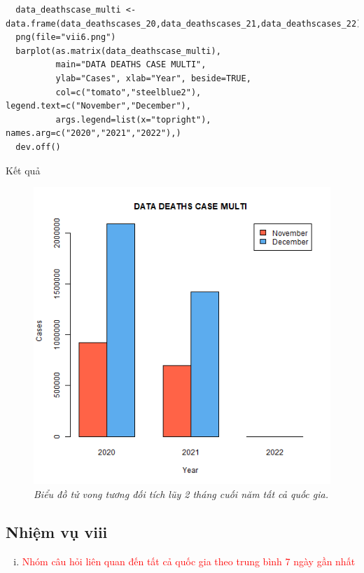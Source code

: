 \documentclass[a4paper]{article}
\theoremstyle{definition}
\begin{document}
\begin{enumerate}[1)]
\begin{lstlisting}
  data_deathscase_multi <- data.frame(data_deathscases_20,data_deathscases_21,data_deathscases_22)
  png(file="vii6.png")
  barplot(as.matrix(data_deathscase_multi),
          main="DATA DEATHS CASE MULTI",
          ylab="Cases", xlab="Year", beside=TRUE, 
          col=c("tomato","steelblue2"), legend.text=c("November","December"), 
          args.legend=list(x="topright"), names.arg=c("2020","2021","2022"),)
  dev.off()
\end{lstlisting}
Kết quả
\begin{figure}[H]
        \begin{center}
            \includegraphics[scale=0.4]{vii/vii6.png} 
        \end{center}
        \vspace{+3mm}\caption{\it Biểu đồ tử vong tương đối tích lũy 2 tháng cuối năm tất cả quốc gia.}
    \end{figure}
\end{enumerate}











\subsection{Nhiệm vụ viii}
\begin{enumerate}[viii)]
\item \textcolor{red}{Nhóm câu hỏi liên quan đến tất cả quốc gia theo trung bình 7 ngày gần nhất}
\end{enumerate}
\end{document}
